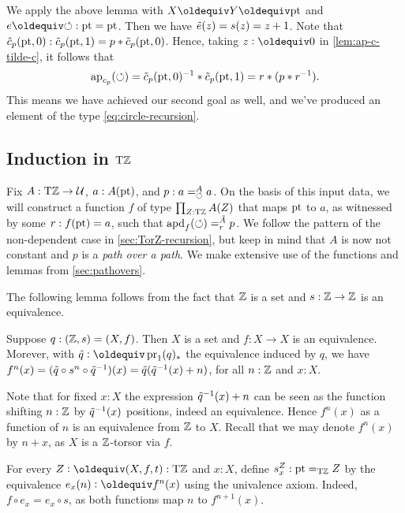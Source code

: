 \documentclass[a4paper,12pt]{amsart}
\begin{document}
We apply the above lemma with $X\jdeq Y\jdeq \pt$ and $e\jdeq{\Zloop}: \pt=\pt$.
Then we have $\tilde {e}(z)=s(z)=z+1$.
Note that $\hat c_p({\mathord{\mathrm{pt}}},0) : \tilde c_p({\mathord{\mathrm{pt}}},1) = p * \tilde c_p({\mathord{\mathrm{pt}}},0)$.
Hence, taking $z\defeq 0$ in \cref{lem:ap-c-tilde-c}, it follows that
\[
  \mathop{{\mathrm{ap}}_{c_p}}({\circlearrowleft}) = \tilde c_p({\mathord{\mathrm{pt}}},0)^{-1} * \tilde c_p({\mathord{\mathrm{pt}}},1)
  = r * (p * r^{-1}).
\]
This means we have achieved our second goal as well,
and we've produced an element of the type \eqref{eq:circle-recursion}.

\subsection{Induction in \texorpdfstring{${\mathrm{T}\mathbb{Z}}$}{TZ}}
\label{sec:TorZ-induction}

Fix $A:{\mathrm{T}\mathbb{Z}}\to\mathcal{U}$, $a:A({\mathord{\mathrm{pt}}})$, and $p: a=^A_{{\circlearrowleft}} a$.
On the basis of this input data, we will construct a function $f$ of
type $\prod_{Z:{\mathrm{T}\mathbb{Z}}} A(Z)$ that maps ${\mathord{\mathrm{pt}}}$ to $a$,
as witnessed by some $r : f({\mathord{\mathrm{pt}}}) = a$,
such that $\mathop{{\mathrm{apd}}_{f}}({\circlearrowleft}) =^{\tilde A}_r p$.
We follow the pattern of the non-dependent case
in \cref{sec:TorZ-recursion}, but keep in mind that
$A$ is now not constant and $p$ is a \emph{path over a path}.
{We make extensive use of the functions and lemmas from \cref{sec:pathovers}.}

The following lemma follows from the fact that $\mathbb{Z}$ is a set
and $s: \mathbb{Z}\to\mathbb{Z}$ is an equivalence.

\begin{lemma}\label{lem:paths-in-TorZ}
  Suppose $q : (\mathbb{Z},s)=(X,f)$.  Then $X$ is a set and $f: X\to X$ is an equivalence.
  Morever, with $\ptoe{q}\defeq \pr_1(q)_*$ the equivalence induced by $q$, we have
  $f^n(x) = (\tilde {q}\circ s^n \circ \tilde {q}^{-1})(x) = \tilde {q}(\tilde {q}^{-1}(x)+n)$,
  for all $n:\mathbb{Z}$ and $x:X$.
\end{lemma}

Note that for fixed $x:X$ the expression $\tilde {q}^{-1}(x)+n$ can be seen as
the function shifting $n:\mathbb{Z}$ by $\tilde {q}^{-1}(x)$ positions, indeed an equivalence.
Hence $f^n(x)$ as a function of $n$ is an equivalence from $\mathbb{Z}$ to $X$.
Recall that we may denote $f^n(x)$ by $n+x$,
as $X$ is a $\mathbb{Z}$-torsor via $f$.

\begin{definition}\label{def:loop-s-iterated}
  For every $Z\defeq(X,f,t):\TorZ$ and $x:X$,
  define $s^Z_x: {\mathord{\mathrm{pt}}} =_{\mathrm{T}\mathbb{Z}} Z$ by the equivalence
  $e_x(n)\defeq f^n(x)$ using the univalence axiom. Indeed,
  $f\circ e_x = e_x \circ s$, as both functions map $n$ to $f^{n+1}(x)$.
\end{definition}
\end{document}
